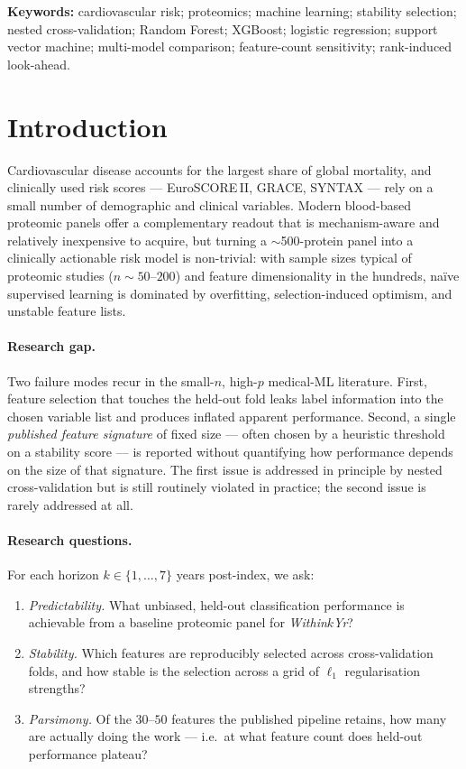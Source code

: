 \documentclass[11pt,a4paper]{article}
\begin{document}
\vspace{0.5em}
\noindent\textbf{Keywords:} cardiovascular risk; proteomics; machine learning;
stability selection; nested cross-validation; Random Forest; XGBoost;
logistic regression; support vector machine; multi-model comparison;
feature-count sensitivity; rank-induced look-ahead.

\section{Introduction}
\label{sec:intro}

Cardiovascular disease accounts for the largest share of global mortality, and
clinically used risk scores --- EuroSCORE\,II, GRACE, SYNTAX --- rely on a
small number of demographic and clinical variables. Modern blood-based
proteomic panels offer a complementary readout that is mechanism-aware and
relatively inexpensive to acquire, but turning a $\sim$500-protein panel into
a clinically actionable risk model is non-trivial: with sample sizes
typical of proteomic studies ($n\sim 50$--$200$) and feature dimensionality
in the hundreds, na\"ive supervised learning is dominated by overfitting,
selection-induced optimism, and unstable feature lists.

\paragraph{Research gap.}
Two failure modes recur in the small-$n$, high-$p$ medical-ML literature.
First, feature selection that touches the held-out fold leaks label
information into the chosen variable list and produces inflated apparent
performance. Second, a single \emph{published feature signature}
of fixed size --- often chosen by a heuristic threshold on a stability
score --- is reported without quantifying how performance depends on the
size of that signature. The first issue is addressed in principle by nested
cross-validation but is still routinely violated in practice; the second
issue is rarely addressed at all.

\paragraph{Research questions.}
For each horizon $k\in\{1,\dots,7\}$ years post-index, we ask:
\begin{enumerate}[label=(\textbf{Q\arabic*}),leftmargin=*]
  \item \emph{Predictability.} What unbiased, held-out classification
    performance is achievable from a baseline proteomic panel for
    \emph{Within$k$Yr}?
  \item \emph{Stability.} Which features are reproducibly selected across
    cross-validation folds, and how stable is the selection across a
    grid of $\ell_1$ regularisation strengths?
  \item \emph{Parsimony.} Of the $30$--$50$ features the published
    pipeline retains, how many are actually doing the work --- i.e.\ at
    what feature count does held-out performance plateau?
\end{enumerate}
\end{document}
